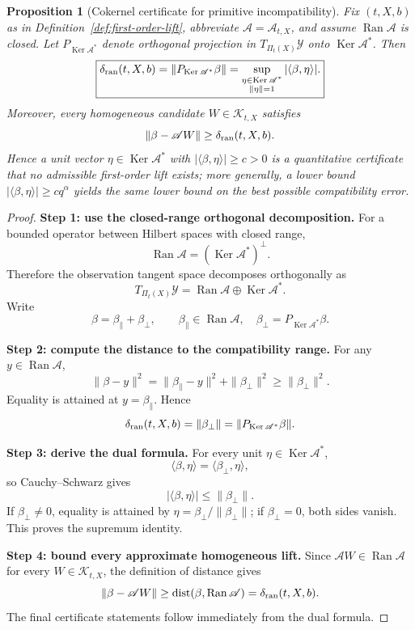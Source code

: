 \documentclass[12pt]{article}
\newtheorem{proposition}[theorem]{Proposition}
\newcommand{\Y}{\mathcal Y}
\newcommand{\Ran}{\operatorname{Ran}}
\newcommand{\Ker}{\operatorname{Ker}}
\newcommand{\dist}{\operatorname{dist}}
\newcommand{\Kt}{\mathcal K}
\newcommand{\Comp}{\mathscr A}
\begin{document}
\begin{proposition}[Cokernel certificate for primitive incompatibility]\label{prop:cokernel}
Fix $(t,X,b)$ as in Definition~\ref{def:first-order-lift}, abbreviate $\Comp=\Comp_{t,X}$, and assume $\Ran\Comp$ is closed. Let $P_{\Ker\Comp^*}$ denote orthogonal projection in $T_{\Pi_t(X)}\Y$ onto $\Ker\Comp^*$. Then
\[
\boxed{
\delta_{\rm ran}(t,X,b)
=\|P_{\Ker\Comp^*}\beta\|
=\sup_{\substack{\eta\in\Ker\Comp^*\\ \|\eta\|=1}}
|\langle\beta,\eta\rangle|.
}
\]
Moreover, every homogeneous candidate $W\in\Kt_{t,X}$ satisfies
\[
\|\beta-\Comp W\|\ge \delta_{\rm ran}(t,X,b).
\]
Hence a unit vector $\eta\in\Ker\Comp^*$ with $|\langle\beta,\eta\rangle|\ge c>0$ is a quantitative certificate that no admissible first-order lift exists; more generally, a lower bound $|\langle\beta,\eta\rangle|\ge c q^\alpha$ yields the same lower bound on the best possible compatibility error.
\end{proposition}

\begin{proof}
\textbf{Step 1: use the closed-range orthogonal decomposition.}
For a bounded operator between Hilbert spaces with closed range,
\[
\Ran\Comp=(\Ker\Comp^*)^\perp.
\]
Therefore the observation tangent space decomposes orthogonally as
\[
T_{\Pi_t(X)}\Y
=\Ran\Comp\oplus\Ker\Comp^*.
\]
Write
\[
\beta=\beta_{\parallel}+\beta_{\perp},
\qquad
\beta_{\parallel}\in\Ran\Comp,
\quad
\beta_{\perp}=P_{\Ker\Comp^*}\beta.
\]

\textbf{Step 2: compute the distance to the compatibility range.}
For any $y\in\Ran\Comp$,
\[
\|\beta-y\|^2
=\|\beta_{\parallel}-y\|^2+\|\beta_{\perp}\|^2
\ge \|\beta_{\perp}\|^2.
\]
Equality is attained at $y=\beta_{\parallel}$. Hence
\[
\delta_{\rm ran}(t,X,b)=\|\beta_{\perp}\|
=\|P_{\Ker\Comp^*}\beta\|.
\]

\textbf{Step 3: derive the dual formula.}
For every unit $\eta\in\Ker\Comp^*$,
\[
\langle\beta,\eta\rangle
=\langle\beta_{\perp},\eta\rangle,
\]
so Cauchy--Schwarz gives
\[
|\langle\beta,\eta\rangle|
\le\|\beta_{\perp}\|.
\]
If $\beta_{\perp}\neq0$, equality is attained by $\eta=\beta_{\perp}/\|\beta_{\perp}\|$; if $\beta_{\perp}=0$, both sides vanish. This proves the supremum identity.

\textbf{Step 4: bound every approximate homogeneous lift.}
Since $\Comp W\in\Ran\Comp$ for every $W\in\Kt_{t,X}$, the definition of distance gives
\[
\|\beta-\Comp W\|
\ge\dist(\beta,\Ran\Comp)
=\delta_{\rm ran}(t,X,b).
\]
The final certificate statements follow immediately from the dual formula.
\end{proof}
\end{document}
